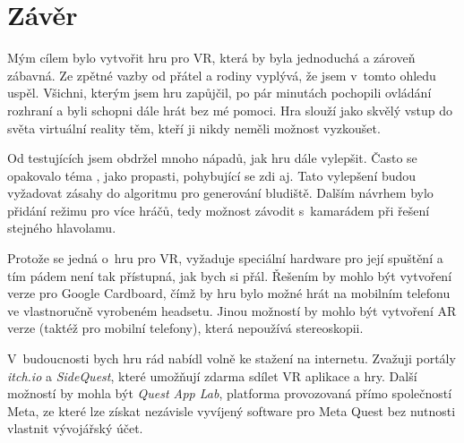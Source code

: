 \chapter*{Závěr}

Mým cílem bylo vytvořit hru pro VR, která by byla jednoduchá a zároveň zábavná. Ze zpětné vazby od přátel a rodiny vyplývá, že jsem v~tomto ohledu uspěl. Všichni, kterým jsem hru zapůjčil, po pár minutách pochopili ovládání rozhraní a byli schopni dále hrát bez mé pomoci. Hra slouží jako skvělý vstup do světa virtuální reality těm, kteří ji nikdy neměli možnost vyzkoušet.

Od testujících jsem obdržel mnoho nápadů, jak hru dále vylepšit. Často se opakovalo téma , jako propasti, pohybující se zdi aj. Tato vylepšení budou vyžadovat zásahy do algoritmu pro generování bludiště. Dalším návrhem bylo přidání režimu pro více hráčů, tedy možnost závodit s~kamarádem při řešení stejného hlavolamu.

Protože se jedná o~hru pro VR, vyžaduje speciální hardware pro její spuštění a tím pádem není tak přístupná, jak bych si přál. Řešením by mohlo být vytvoření verze pro Google Cardboard, čímž by hru bylo možné hrát na mobilním telefonu ve vlastnoručně vyrobeném headsetu. Jinou možností by mohlo být vytvoření AR verze (taktéž pro mobilní telefony), která nepoužívá stereoskopii.

V~budoucnosti bych hru rád nabídl volně ke stažení na internetu. Zvažuji portály \textit{itch.io} a \textit{SideQuest}, které umožňují zdarma sdílet VR aplikace a hry. Další možností by mohla být \textit{Quest App Lab}, platforma provozovaná přímo společností Meta, ze které lze získat nezávisle vyvíjený software pro Meta Quest bez nutnosti vlastnit vývojářský účet.